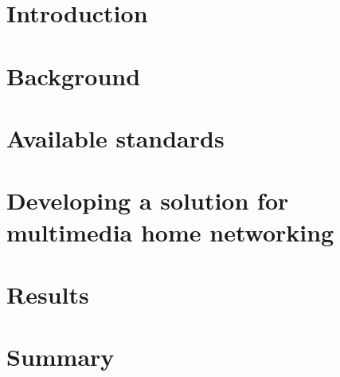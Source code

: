 \documentclass[english,12pt,a4paper,pdftex]{article}
\begin{document}
\section{Introduction}

\thispagestyle{empty}

 

\clearpage

\vspace*{100px}
\section{Background\label{chapter2}}
 


\clearpage

\vspace*{100px}
\section{Available standards\label{chapter2_1}}
 


\clearpage

\vspace*{100px}
\section{Developing a solution for multimedia home networking\label{chapter3}}



\clearpage
\vspace*{100px}
\section{Results\label{chapter4}}



\clearpage
\vspace*{100px}
\section{Summary\label{chapter5}}
\end{document}
